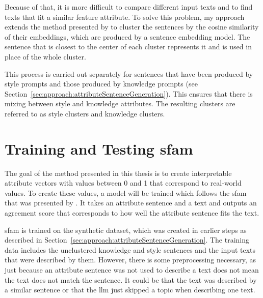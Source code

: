 Because of that, it is more difficult to compare different input texts and to find texts that fit a similar feature attribute.
To solve this problem, my approach extends the method presented by \citet{patelLearningInterpretableStyle2023} to cluster the sentences by the cosine similarity of their embeddings, which are produced by a sentence embedding model.
The sentence that is closest to the center of each cluster represents it and is used in place of the whole cluster.

This process is carried out separately for sentences that have been produced by style prompts and those produced by knowledge prompts (see Section~\ref{sec:approach:attributeSentenceGeneration}). This ensures that there is mixing between style and knowledge attributes.
The resulting clusters are referred to as style clusters and knowledge clusters.


\section{Training and Testing \acs{sfam}}%
\label{sec:approach:sfam}

The goal of the method presented in this thesis is to create interpretable attribute vectors with values between \num{0} and \num{1} that correspond to real-world values. To create these values, a model will be trained which follows the \acf{sfam} that was presented by \citet{patelLearningInterpretableStyle2023}. It takes an attribute sentence and a text and outputs an agreement score that corresponds to how well the attribute sentence fits the text.

\ac{sfam} is trained on the synthetic dataset, which was created in earlier steps as described in Section~\ref{sec:approach:attributeSentenceGeneration}. The training data includes the unclustered knowledge and style sentences and the input texts that were described by them. However, there is some preprocessing necessary, as just because an attribute sentence was not used to describe a text does not mean the text does not match the sentence. It could be that the text was described by a similar sentence or that the \ac{llm} just skipped a topic when describing one text.

